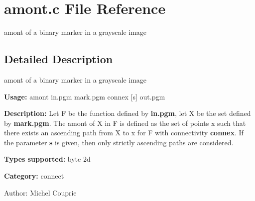 \section{amont.c File Reference}
\label{amont_8c}
amont of a binary marker in a grayscale image  




\label{_details}
\subsection{Detailed Description}
amont of a binary marker in a grayscale image 

{\bf Usage:} amont in.pgm mark.pgm connex [s] out.pgm

{\bf Description:} Let F be the function defined by {\bf in.pgm}, let X be the set defined by {\bf mark.pgm}. The amont of X in F is defined as the set of points x such that there exists an ascending path from X to x for F with connectivity {\bf connex}. If the parameter {\bf s} is given, then only strictly ascending paths are considered.

{\bf Types supported:} byte 2d

{\bf Category:} connect

\begin{Desc}
\item[Author:]Michel Couprie \end{Desc}
